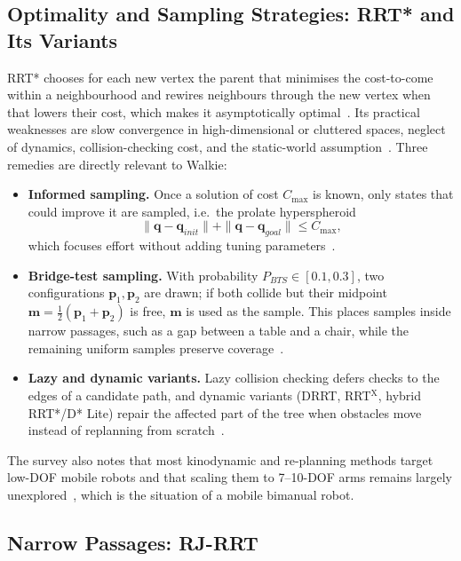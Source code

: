 \documentclass[12pt,a4paper]{article}
\begin{document}
\subsection{Optimality and Sampling Strategies: RRT* and Its Variants}

RRT* chooses for each new vertex the parent that minimises the cost-to-come within a neighbourhood
and rewires neighbours through the new vertex when that lowers their cost, which makes it
asymptotically optimal~\cite{hameed2025}. Its practical weaknesses are slow convergence in
high-dimensional or cluttered spaces, neglect of dynamics, collision-checking cost, and the
static-world assumption~\cite{hameed2025}. Three remedies are directly relevant to Walkie:
\begin{itemize}
    \item \textbf{Informed sampling.} Once a solution of cost $C_{\max}$ is known, only states that could
          improve it are sampled, i.e.\ the prolate hyperspheroid
          \begin{equation}
              \|\mathbf{q}-\mathbf{q}_{init}\|+\|\mathbf{q}-\mathbf{q}_{goal}\|\le C_{\max},
          \end{equation}
          which focuses effort without adding tuning parameters~\cite{hameed2025}.
    \item \textbf{Bridge-test sampling.} With probability $P_{BTS}\in[0.1,0.3]$, two configurations
          $\mathbf{p}_1,\mathbf{p}_2$ are drawn; if both collide but their midpoint
          $\mathbf{m}=\tfrac12(\mathbf{p}_1+\mathbf{p}_2)$ is free, $\mathbf{m}$ is used as the sample.
          This places samples inside narrow passages, such as a gap between a table and a chair, while the
          remaining uniform samples preserve coverage~\cite{hameed2025}.
    \item \textbf{Lazy and dynamic variants.} Lazy collision checking defers checks to the edges of a
          candidate path, and dynamic variants (DRRT, RRT$^{\text{X}}$, hybrid RRT*/D* Lite) repair the
          affected part of the tree when obstacles move instead of replanning from
          scratch~\cite{hameed2025}.
\end{itemize}
The survey also notes that most kinodynamic and re-planning methods target low-DOF mobile robots and
that scaling them to 7--10-DOF arms remains largely unexplored~\cite{hameed2025}, which is the
situation of a mobile bimanual robot.

\subsection{Narrow Passages: RJ-RRT}
\end{document}
